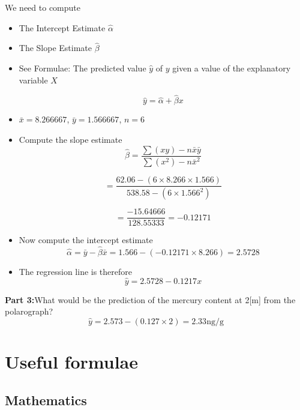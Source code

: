 We need to compute

\begin{itemize}
	
	\item The Intercept Estimate $\hat{\alpha}$
	
	\item The Slope Estimate $\hat{\beta}$
	
	\item See Formulae: The predicted value $\hat{y} $ of $y$ given a value of the explanatory variable $X$
	
	\[\hat{y} = \hat{\alpha} + \hat{\beta}x \]
	
	
	
	\item  $\bar{x} = 8.266667$, $\bar{y} = 1.566667$, $n =6$
	
	\item Compute the slope estimate
	\[\hat{\beta} =  \frac{\sum(xy) - n\bar{x} \bar{y} }{\sum(x^2) - n\bar{x}^2 }\]
	
	\[= \frac{62.06 - (6 \times 8.266 \times 1.566) }{538.58  - (6 \times 1.566^2) }\]
	
	\[= \frac{-15.64666}{128.55333} = -0.12171\]
	
	
	\item Now compute the intercept estimate \[ \hat{\alpha} = \bar{y} - \hat{\beta}\bar{x} = 1.566-(-0.12171 \times 8.266) = 2.5728\]
	\item The regression line is therefore \[\hat{y} = 2.5728 - 0.1217x \]
\end{itemize}




\noindent\textbf{Part 3:}What would be the prediction of the mercury content at 2[m] from the polarograph?
\bigskip
\[ \hat{y} = 2.573 - (0.127 \times 2) = 2.33 \mbox{ng/g}  \]








\section{Useful formulae}

\subsection{Mathematics}

